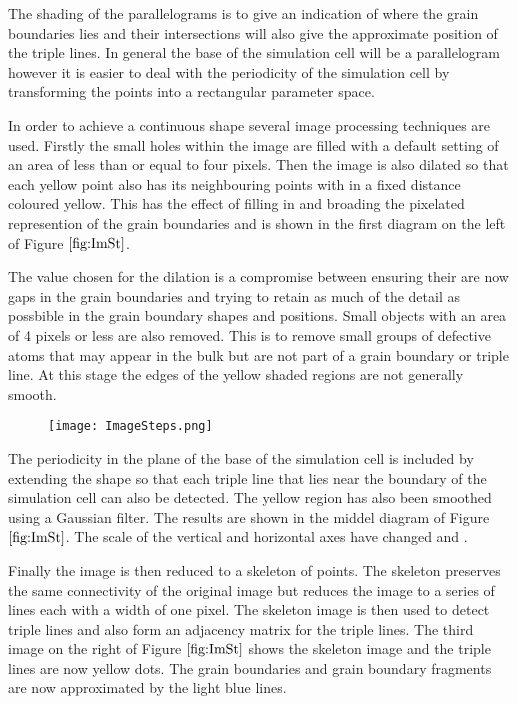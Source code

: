 \documentclass[12pt,a4paper]{book}
\begin{document}
The shading of the parallelograms is to give an indication of where the grain boundaries lies and their intersections will also give the approximate position of the triple lines. In general the base of the simulation cell will be a parallelogram however it is easier to deal with the periodicity of the simulation cell by transforming the points into a rectangular parameter space. 

In order to achieve a continuous shape several image processing techniques are used. Firstly the small holes within the image are filled with a default setting of an area of less than or equal to four pixels. Then the image is also dilated so that each yellow point also has its neighbouring points with in a fixed distance coloured yellow. This has the effect of filling in and broading the pixelated represention of the grain boundaries and is shown in the first diagram on the left of Figure $\ref{fig:ImSt}$. 

The value chosen for the dilation is a compromise between ensuring their are now gaps in the grain boundaries and trying to retain as much of the detail as possbible in the grain boundary shapes and positions. Small objects with an area of 4 pixels or less are also removed. This is to remove small groups of defective atoms that may appear in the bulk but are not part of a grain boundary or triple line. At this stage the edges of the yellow shaded regions are not generally smooth.

 
\begin{figure}[H]
	\centering
	\texttt{[image: ImageSteps.png]}   
\end{figure}
\label{fig:ImSt}

The periodicity in the plane of the base of the simulation cell is included by extending the shape so that each triple line that lies near the boundary of the simulation cell can also be detected. The yellow region has also been smoothed using a Gaussian filter. The results are shown in the middel diagram of Figure $\ref{fig:ImSt}$. The scale of the vertical and horizontal axes have changed and . 

Finally the image is then reduced to a skeleton of points. The skeleton preserves the same connectivity of the original image but reduces the image to a series of lines each with a width of one pixel. The skeleton image is then used to detect triple lines and also form an adjacency matrix for the triple lines. The third image on the right of Figure $\ref{fig:ImSt}$ shows the skeleton image and the triple lines are now yellow dots. The grain boundaries and grain boundary fragments are now approximated by the light blue lines.
\end{document}
